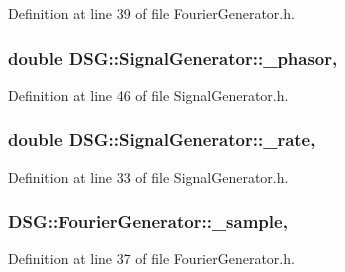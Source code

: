 Definition at line 39 of file Fourier\+Generator.\+h.

\hypertarget{classDSG_1_1SignalGenerator_ac2271b582bf699275f077ecb642a8cd9}{
\subsubsection[{\+\_\+phasor}]{\setlength{\rightskip}{0pt plus 5cm}double D\+S\+G\+::\+Signal\+Generator\+::\+\_\+phasor\hspace{0.3cm}{\ttfamily [protected]}, {\ttfamily [inherited]}}}\label{classDSG_1_1SignalGenerator_ac2271b582bf699275f077ecb642a8cd9}


Definition at line 46 of file Signal\+Generator.\+h.

\hypertarget{classDSG_1_1SignalGenerator_aa10f6c85d9adee901139ea7fb346f39d}{
\subsubsection[{\+\_\+rate}]{\setlength{\rightskip}{0pt plus 5cm}double D\+S\+G\+::\+Signal\+Generator\+::\+\_\+rate\hspace{0.3cm}{\ttfamily [protected]}, {\ttfamily [inherited]}}}\label{classDSG_1_1SignalGenerator_aa10f6c85d9adee901139ea7fb346f39d}


Definition at line 33 of file Signal\+Generator.\+h.

\hypertarget{classDSG_1_1FourierGenerator_ab96bed1cd59c42e82a689036e5c62bef}{
\subsubsection[{\+\_\+sample}]{ D\+S\+G\+::\+Fourier\+Generator\+::\+\_\+sample\hspace{0.3cm}{\ttfamily [protected]}, {\ttfamily [inherited]}}}\label{classDSG_1_1FourierGenerator_ab96bed1cd59c42e82a689036e5c62bef}


Definition at line 37 of file Fourier\+Generator.\+h.

